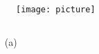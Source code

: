 \documentclass{article}
\begin{document}
\begin{figure}[H]
	\texttt{[image: picture]}
\end{figure}

\subsection{}
\begin{itemize}
	\item[(a)]
\end{itemize}
\end{document}
